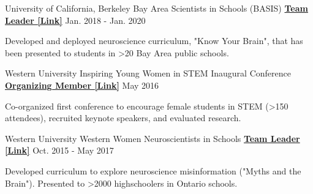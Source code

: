 \begin{cventries}
\begin{cventries}
\end{cventries}
    

\begin{cventries}

  \cventry
  	{University of California, Berkeley} %
  	{Bay Area Scientists in Schools (BASIS)}
    {\href{https://docs.google.com/document/d/1EgLHC_wA5ZApCDpqfWc4APGsVKdoymPw/edit?usp=sharing&ouid=110847987931723045299&rtpof=true&sd=true}{\textbf{Team Leader [Link]}}} %
    {Jan. 2018 - Jan. 2020} %
    {
      \begin{cvitems} %
        \item {Developed and deployed neuroscience curriculum, "Know Your Brain", that has been presented to students in >20 Bay Area public schools.}
      \end{cvitems}
    }
    
  \cventry
    {Western University} %
    {Inspiring Young Women in STEM Inaugural Conference}
    {\href{https://www.inspiringdiversityinstem.com/2016-conference}{\textbf{Organizing Member [Link]}}} %
    {May 2016} %
    {
      \begin{cvitems} %
        \item {Co-organized first conference to encourage female students in STEM (>150 attendees), recruited keynote speakers, and evaluated research.}
      \end{cvitems}
    }
    
  \cventry
    {Western University}
    {Western Women Neuroscientists in Schools}
  	{\href{https://docs.google.com/presentation/d/1Dp3vELEXbNYQtvaOYiP4Rntj-JdygQvZ/edit?usp=sharing&ouid=110847987931723045299&rtpof=true&sd=true}{\textbf{Team Leader [Link]}}} %
    {Oct. 2015 - May 2017} %
    {
      \begin{cvitems} %
        \item {Developed curriculum to explore neuroscience misinformation ("Myths and the Brain"). Presented to >2000 highschoolers in Ontario schools.}
      \end{cvitems}
    }
    

\end{cventries}
\end{cventries}
